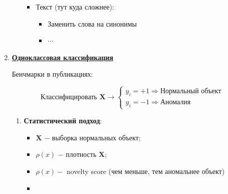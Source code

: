 \begin{enumerate}
\begin{enumerate}
\begin{itemize}
                        \item Текст (тут куда сложнее):
                            \begin{itemize}
                                \item Заменить слова на синонимы
                                \item $\cdots$
                            \end{itemize}
                    \end{itemize}
            \end{enumerate}

            \item \underline{\textbf{Одноклассовая классификация}}

                Бенчмарки в публикациях:
               
                \begin{equation*}
                    \text{Классифицировать} \,\, \mathbf{X} \longrightarrow
                    \begin{cases}
                        y_i = +1 \Longrightarrow \text{Нормальный объект} \\
                        y_i = -1 \Longrightarrow \text{Аномалия}
                    \end{cases}
                \end{equation*}
           
                 \begin{enumerate}
                     \item \textbf{Статистический подход}:
                     \begin{itemize}
                         \item $\mathbf{X}$ $-$ выборка нормальных объект;

                         \item $\rho(x)$ $-$ плотность $\mathbf{X}$;

                         \item $\rho(x) - $ novelty score (чем меньше, тем аномальнее объект)\\

                        \item {}
                         \begin{itemize}
                             \item \underline{Параметрический подход}:
                             \begin{center}
                                 $\sum\limits_{i = 1}^\ell \log \rho(x_i \mid \Theta )$ $\longrightarrow \max\limits_\Theta$}
                             \end{center}
                             

\end{itemize}
\end{itemize}
\end{enumerate}
\end{enumerate}
